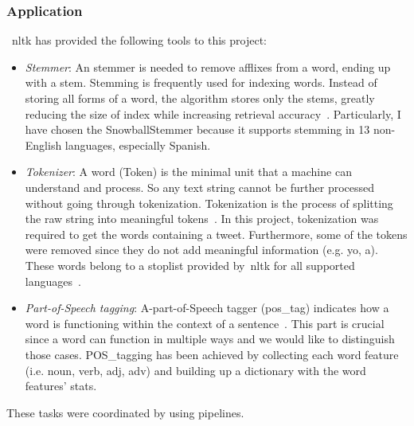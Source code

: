 \subsubsection{Application}
~\ac{nltk} has provided the following tools to this project:
\begin{itemize}
    \item \textit{Stemmer}: An stemmer is needed to remove afflixes from a word, ending up with a stem. Stemming is frequently used for indexing words. Instead of storing all forms of a word, the algorithm stores only the stems, greatly reducing the size of index while increasing retrieval accuracy~\cite{nltk}. Particularly, I have chosen the SnowballStemmer because it supports stemming in 13 non-English languages, especially Spanish.
    \item \textit{Tokenizer}: A word (Token) is the minimal unit that a machine can understand and process. So any text string cannot be further processed without going through tokenization. Tokenization is the process of splitting the raw string into meaningful tokens~\cite{nltk}. In this project, tokenization was required to get the words containing a tweet. Furthermore, some of the tokens were removed since they do not add meaningful information (e.g. yo, a). These words belong to a stoplist provided by~\ac{nltk} for all supported languages~\cite{nltk}.
    \item \textit{Part-of-Speech tagging}:  A-part-of-Speech tagger (pos\_tag) indicates how a word is functioning within the context of a sentence~\cite{pos}. This part is crucial since a word can function in multiple ways and we would like to distinguish those cases. POS\_tagging has been achieved by collecting each word feature (i.e. noun, verb, adj, adv) and building up a dictionary with the word features' stats.
\end{itemize}

These tasks were coordinated by using pipelines. 

